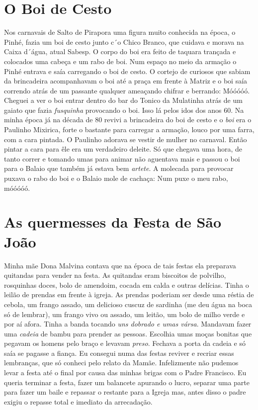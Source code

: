 \documentclass[12pt,brazil,]{book}
\begin{document}
\section{O Boi de Cesto}\label{o-boi-de-cesto}

Nos carnavais de Salto de Pirapora uma figura muito conhecida na época,
o Pinhé, fazia um boi de cesto junto c´o Chico Branco, que cuidava e
morava na Caixa d´água, atual Sabesp. O corpo do boi era feito de
taquara trançada e colocados uma cabeça e um rabo de boi. Num espaço no
meio da armação o Pinhé entrava e saía carregando o boi de cesto. O
cortejo de curiosos que sabiam da brincadeira acompanhavam o boi até a
praça em frente à Matriz e o boi saía correndo atrás de um passante
qualquer ameaçando chifrar e berrando: Móóóóó. Cheguei a ver o boi
entrar dentro do bar do Tonico da Mulatinha atrás de um gaiato que fazia
\emph{fusquinha} provocando o boi. Isso lá pelos idos dos anos 60. Na
minha época já na década de 80 revivi a brincadeira do boi de cesto e o
\emph{boi} era o Paulinho Mixirica, forte o bastante para carregar a
armação, louco por uma farra, com a cara pintada. O Paulinho adorava se
vestir de mulher no carnaval. Então pintar a cara para êle era um
verdadeiro deleite. Só que chegava uma hora, de tanto correr e tomando
umas para animar não aguentava mais e passou o boi para o Balaio que
também já estava bem \emph{artete}. A molecada para provocar puxava o
rabo do boi e o Balaio mole de cachaça: Num puxe o meu rabo, móóóóó.

\section{As quermesses da Festa de São
João}\label{as-quermesses-da-festa-de-suxe3o-jouxe3o}

Minha mãe Dona Malvina contava que na época de tais festas ela preparava
quitandas para vender na festa. As quitandas eram biscoitos de polvilho,
rosquinhas doces, bolo de amendoim, cocada em calda e outras delícias.
Tinha o leilão de prendas em frente à igreja. As prendas poderiam ser
desde uma réstia de cebola, um frango assado, um delicioso cuscuz de
sardinha (me deu água na boca só de lembrar), um frango vivo ou assado,
um leitão, um bolo de milho verde e por aí afora. Tinha a banda tocando
\emph{uns dobrado e umas vársa}. Mandavam fazer uma \emph{cadeia} de
bambu para prender as pessoas. Escolhia umas moças bonitas que pegavam
os homens pelo braço e levavam \emph{preso}. Fechava a porta da cadeia e
só saía se pagasse a fiança. Eu consegui numa das festas reviver e
recriar essas lembranças, que só conheci pelo relato da Mamãe.
Infelizmente não pudemos levar a festa até o final por causa das minhas
brigas com o Padre Francisco. Eu queria terminar a festa, fazer um
balancete apurando o lucro, separar uma parte para fazer um baile e
repassar o restante para a Igreja mas, antes disso o padre exigiu o
repasse total e imediato da arrecadação.
\end{document}
